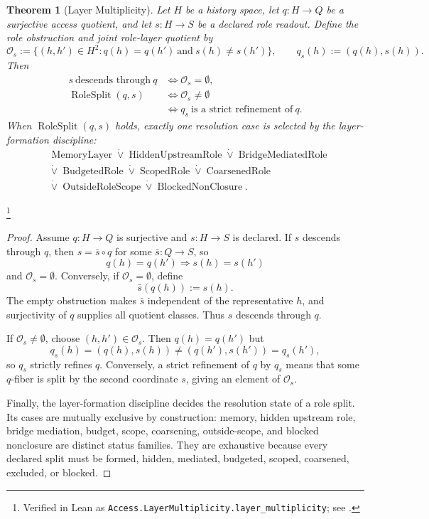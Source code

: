 \documentclass[11pt]{article}
\newtheorem{theorem}{Theorem}[section]
\theoremstyle{definition}
\begin{document}
\begin{theorem}[Layer Multiplicity]\label{thm:F24}
Let \(H\) be a history space, let \(q:H\to Q\) be a surjective access
quotient, and let \(s:H\to S\) be a declared role readout.  Define
the role obstruction and joint role-layer quotient by
\[
  \mathcal O_s
  :=
  \{(h,h')\in H^2:q(h)=q(h')\ \text{and}\ s(h)\ne s(h')\},
  \qquad
  q_s(h):=(q(h),s(h)).
\]
Then
\begin{align*}
  s\ \text{descends through}\ q
  &\iff \mathcal O_s=\emptyset,\\
  \operatorname{RoleSplit}(q,s)
  &\iff \mathcal O_s\ne\emptyset\\
  &\iff q_s\ \text{is a strict refinement of}\ q.
\end{align*}
When \(\operatorname{RoleSplit}(q,s)\) holds, exactly one resolution
case is selected by the layer-formation discipline:
\begin{align*}
  &\operatorname{MemoryLayer}
  \mathbin{\dot\vee}
  \operatorname{HiddenUpstreamRole}
  \mathbin{\dot\vee}
  \operatorname{BridgeMediatedRole}\\
  &\mathbin{\dot\vee}
  \operatorname{BudgetedRole}
  \mathbin{\dot\vee}
  \operatorname{ScopedRole}
  \mathbin{\dot\vee}
  \operatorname{CoarsenedRole}\\
  &\mathbin{\dot\vee}
  \operatorname{OutsideRoleScope}
  \mathbin{\dot\vee}
  \operatorname{BlockedNonClosure}.
\end{align*}
\end{theorem}
\footnote{Verified in Lean as
\texttt{Access.LayerMultiplicity.layer\_multiplicity}; see
.}
\begin{proof}
Assume \(q:H\to Q\) is surjective and \(s:H\to S\) is declared.  If
\(s\) descends through \(q\), then \(s=\bar s\circ q\) for some
\(\bar s:Q\to S\), so
\[
  q(h)=q(h')\Longrightarrow s(h)=s(h')
\]
and \(\mathcal O_s=\emptyset\).  Conversely, if
\(\mathcal O_s=\emptyset\), define
\[
  \bar s(q(h)):=s(h).
\]
The empty obstruction makes \(\bar s\) independent of the
representative \(h\), and surjectivity of \(q\) supplies all quotient
classes.  Thus \(s\) descends through \(q\).

If \(\mathcal O_s\ne\emptyset\), choose
\((h,h')\in\mathcal O_s\).  Then \(q(h)=q(h')\) but
\[
  q_s(h)=(q(h),s(h))\ne(q(h'),s(h'))=q_s(h'),
\]
so \(q_s\) strictly refines \(q\).  Conversely, a strict refinement of
\(q\) by \(q_s\) means that some \(q\)-fiber is split by the second
coordinate \(s\), giving an element of \(\mathcal O_s\).

Finally, the layer-formation discipline decides the resolution state
of a role split.  Its cases are mutually exclusive by construction:
memory, hidden upstream role, bridge mediation, budget, scope,
coarsening, outside-scope, and blocked nonclosure are distinct status
families.  They are exhaustive because every declared split must be
formed, hidden, mediated, budgeted, scoped, coarsened, excluded, or
blocked.
\end{proof}
\end{document}
